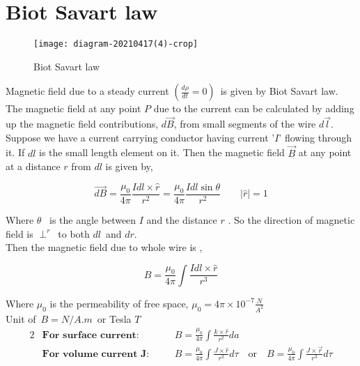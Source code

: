 \section{Biot Savart law}
 \begin{wrapfigure}{r}{0.25\textwidth}
	\begin{center}
		\texttt{[image: diagram-20210417(4)-crop]}
	\end{center}
	\caption{Biot Savart law}
\end{wrapfigure}
Magnetic field due to a steady current ${(\frac{d\rho}{dt}=0)}$\ is given by Biot Savart law.
The magnetic field at any point $P$ due to the current can be calculated by adding up the magnetic field contributions, $d \vec{{B}}$, from small segments of the wire $d \vec{l}$.
	\\Suppose we have a current carrying conductor having current '$I$' flowing through it. If $dl$ is the small length element on it. Then the magnetic field $\vec{B}$ at any point at a distance $r$ from $dl$ is given by,
	\begin{center}
	\begin{equation}\label{key}
	\vec{dB}={\frac{\mu_0}{4\pi}\frac{Idl\times{\hat{r}}}{r^2}}=\frac{\mu_0}{4\pi}\frac{Idl\sin\theta}{r^2}\qquad \vert{\hat{r}\vert}=1
	\end{equation}
	\end{center}
	Where $\theta$ \ is the angle between $I$ and the distance $r$ . So the direction of magnetic field is $\perp^r$\ to both $dl$\ and $dr$. \\Then the magnetic field due to whole wire is ,
	\begin{center}
		\begin{equation}\label{key}
		B=\frac{\mu_0}{4\pi}\int\frac{Idl\times\hat{r}}{r^3}
		\end{equation}
	\end{center}
 Where $\mu_0$ is the permeability of free space, $ \mu_0=4\pi\times10^{-7}\frac{N}{A^2}$\\
Unit of\ $B =N/A.m $\ or Tesla $T$
	\begin{alignat*}{2}
	&\textbf{For surface current:}\quad  &&B=\frac{\mu_0}{4\pi}\int\frac{k\times\hat{r}}{r^2}da\\ 
	&\textbf{For volume current J:}\quad  &&B=\frac{\mu_0}{4\pi}\int\frac{J\times\hat{r}}{r^2}d\tau \quad \text{or}\quad B=\frac{\mu_0}{4\pi}\int\frac{J\times\vec{r}}{r^3}d\tau\\
	\end{alignat*}
